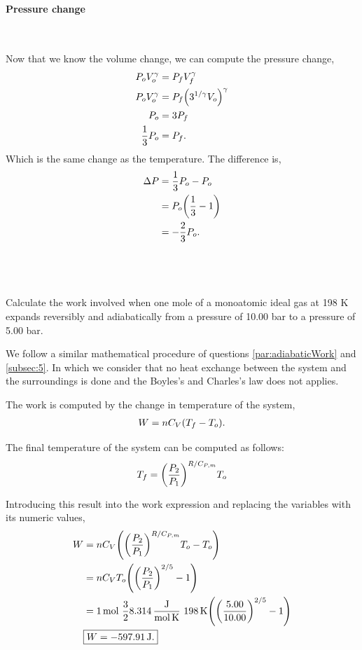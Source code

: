 \documentclass[main.tex]{subfiles}
\begin{document}
\paragraph{Pressure change}~

Now that we know the volume change, we can compute the pressure change,
\begin{align*}
    P_oV_o^\gamma &= P_fV_f^\gamma \\
    P_oV_o^\gamma &= P_f\qty(3^{1/\gamma}V_o)^\gamma \\
    P_o &= 3P_f  \\
    \frac{1}{3}P_o &= P_f.
\end{align*}
Which is the same change as the temperature.
The difference is,
\begin{align*}
    \Delta P &= \frac{1}{3}P_o - P_o \\
    &= P_o\qty(\frac{1}{3}-1) \\
    &= -\frac{2}{3}P_o.
\end{align*}

\subsection{~}
Calculate the work involved when one mole of a monoatomic ideal gas at 198 K expands reversibly and adiabatically from a pressure of 10.00 bar to a pressure of 5.00 bar.

We follow a similar mathematical procedure of questions \ref{par:adiabaticWork} and \ref{subsec:5}.
In which we consider that no heat exchange between the system and the surroundings is done and the Boyles's and Charles's law does not applies.

The work is computed by the change in temperature of the system,
\begin{gather*}
    W = nC_V\qty(T_f-T_o).
\end{gather*}

The final temperature of the system can be computed as follows:
\begin{gather*}
    T_f = \qty(\frac{P_2}{P_1})^{R/C_{P,m}}T_o
\end{gather*}

Introducing this result into the work expression and replacing the variables with its numeric values,
\begin{align*}
    W &= nC_V\qty(\qty(\frac{P_2}{P_1})^{R/C_{P,m}}T_o-T_o) \\
    &= nC_V T_o\qty(\qty(\frac{P_2}{P_1})^{2/5}-1) \\
    &= \SI{1}{\mol}~\frac{3}{2}\SI[per-mode=fraction]{8.314}{\joule\per\mole\per\kelvin}~\SI{198}{\kelvin}\qty(\qty(\frac{5.00}{10.00})^{2/5}-1) \\
    &\begin{gathered}
        \boxed{W = -\SI{597.91}{\joule}.}
    \end{gathered}
\end{align*}
\end{document}
